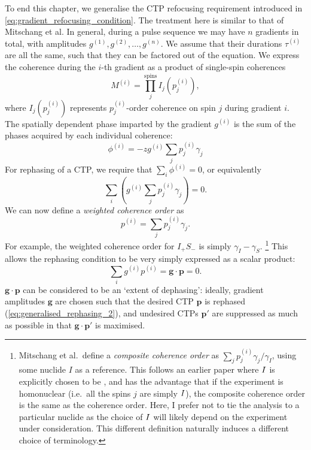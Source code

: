 To end this chapter, we generalise the CTP refocusing requirement introduced in \cref{eq:gradient_refocusing_condition}.
The treatment here is similar to that of Mitschang et al.\autocite{Mitschang1995JCP}
In general, during a pulse sequence we may have $n$ gradients in total, with amplitudes $g^{(1)}, g^{(2)}, \ldots, g^{(n)}$.
We assume that their durations $\tau^{(i)}$ are all the same, such that they can be factored out of the equation.
We express the coherence during the $i$-th gradient as a product of single-spin coherences
\begin{equation}
    \label{eq:generalised_coherence}
    M^{(i)} = \prod_j^{\text{spins}} I_j(p_j^{(i)}),
\end{equation}
where $I_j(p_j^{(i)})$ represents $p_j^{(i)}$-order coherence on spin $j$ during gradient $i$.
The spatially dependent phase imparted by the gradient $g^{(i)}$ is the sum of the phases acquired by each individual coherence:
\begin{equation}
    \label{eq:generalised_phase}
    \phi^{(i)} = -zg^{(i)} \sum_j p_j^{(i)}\gamma_j
\end{equation}
For rephasing of a CTP, we require that $\sum_i \phi^{(i)} = 0$, or equivalently
\begin{equation}
    \label{eq:generalised_rephasing_1}
    \sum_i \left( g^{(i)}\sum_j p_j^{(i)}\gamma_j\right) = 0.
\end{equation}
We can now define a \textit{weighted coherence order}\autocite{John1991JMR} as
\begin{equation}
    \label{eq:weighted_coherence_order}
    p^{(i)} = \sum_j p_j^{(i)}\gamma_j.
\end{equation}
For example, the weighted coherence order for $I_+S_-$ is simply $\gamma_I - \gamma_S$.%
\footnote{Mitschang et al.\ define a \textit{composite coherence order} as $\sum_j p_j^{(i)}\gamma_j/\gamma_I$, using some nuclide $I$ as a reference. This follows an earlier paper\autocite{John1991JMR} where $I\/$ is explicitly chosen to be \proton{}, and has the advantage that if the experiment is homonuclear (i.e.\ all the spins $j$ are simply $I\/$), the composite coherence order is the same as the coherence order. Here, I prefer not to tie the analysis to a particular nuclide as the choice of $I\/$ will likely depend on the experiment under consideration. This different definition naturally induces a different choice of terminology.}
This allows the rephasing condition to be very simply expressed as a scalar product:
\begin{equation}
    \label{eq:generalised_rephasing_2}
    \sum_i g^{(i)} p^{(i)} = \symbf{g} \cdot \symbf{p} = 0.
\end{equation}
$\symbf{g} \cdot \symbf{p}$ can be considered to be an `extent of dephasing': ideally, gradient amplitudes $\symbf{g}$ are chosen such that the desired CTP $\symbf{p}$ is rephased (\cref{eq:generalised_rephasing_2}), and undesired CTPs $\symbf{p'}$ are suppressed as much as possible in that $\symbf{g} \cdot \symbf{p'}$ is maximised.
